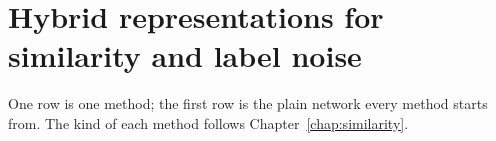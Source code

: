 \section{Hybrid representations for similarity and label noise}\label{app:add:similarity}

\label{app:add:lnl_settings}
One row is one method; the first row is the plain network every method starts from. The kind of each method follows Chapter~\ref{chap:similarity}.


